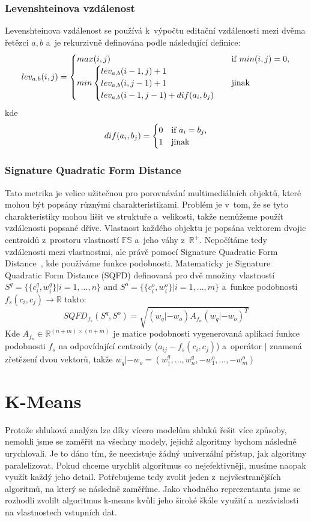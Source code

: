 \subsubsection{Levenshteinova vzdálenost} Levenshteinova vzdálenost se používá k~výpočtu editační vzdálenosti mezi dvěma řetězci $ a, b $ a~je rekurzivně definována podle následující definice:
\begin{equation*}
lev_{a,b}(i,j)=
\begin{cases}
max(i,j) & $if $ min(i,j)=0, \cr
min \begin{cases}
lev_{a,b}(i-1,j) + 1 \cr
lev_{a,b}(i,j-1) + 1 \cr
lev_{a,b}(i-1,j-1) + dif(a_i,b_j)
\end{cases} & $jinak$
\end{cases}
\end{equation*}
kde \begin{equation*}
dif(a_i,b_j)=
\begin{cases}
0 & $if $ a_i = b_j, \cr
1 & $jinak$
\end{cases}
\end{equation*}

\subsubsection{Signature Quadratic Form Distance}
Tato metrika je velice užitečnou pro porovnávání multimediálních objektů, které mohou být popsány různými charakteristikami. Problém je v~tom, že se tyto charakteristiky mohou lišit ve struktuře a~velikosti, takže nemůžeme použít vzdálenosti popsané dříve. Vlastnost každého objektu je popsána vektorem dvojic centroidů z~prostoru vlastností $\mathbb{FS}$ a~jeho váhy z~$\mathbb{R^{+}}$.
Nepočítáme tedy vzdálenosti mezi vlastnostmi, ale právě pomocí Signature Quadratic Form Distance~\cite{Beecks10}, kde používáme funkce podobnosti.
Matematicky je Signature Quadratic Form Distance (SQFD) definovaná pro dvě množiny vlastností $S^{q} = \{\{c_i^q, w_i^q\}|i=1,...,n\}$ and $S^{o} = \{\{c_i^o, w_i^o\}|i=1,...,m\}$ a~funkce podobnosti $f_s(c_i, c_j)\to \mathbb{R}$ takto:
$$SQFD_{f_s}(S^q,S^o)=\sqrt{(w_q|-w_o)A_{f_n}(w_q|-w_o)^T}$$
Kde $A_{f_n} \in \mathbb{R}^{(n+m)\times(n+m)}$ je matice podobnosti vygenerovaná aplikací funkce podobnosti $f_s$ na odpovídající centroidy  ($a_{ij}-f_s(c_i,c_j)$) a~operátor $|$ znamená zřetězení dvou vektorů, takže $w_q|-w_o = (w_1^q,...,w_n^q,-w_1^o,...,-w_m^o)$\\

\section{K-Means} 
Protože shluková analýza lze díky vícero modelům shluků řešit více způsoby, nemohli jsme se zaměřit na všechny modely, jejichž algoritmy bychom následně urychlovali. Je to dáno tím, že neexistuje žádný univerzální přístup, jak algoritmy paralelizovat. Pokud chceme urychlit algoritmus co nejefektivněji, musíme naopak využít každý jeho detail. Potřebujeme tedy zvolit jeden z~nej\-vše\-stra\-něj\-ších algoritmů, na který se následně zaměříme. Jako vhodného reprezentanta jsme se rozhodli zvolilt algoritmus k-means kvůli jeho široké škále využití a~nezávislosti na vlastnostech vstupních dat. \\

